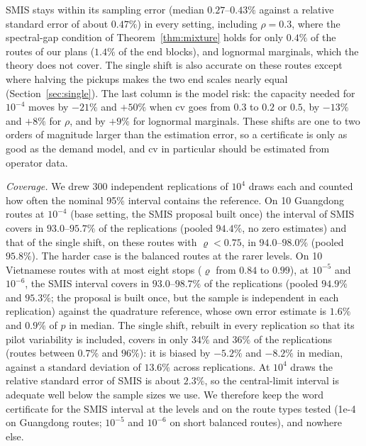 \documentclass[11pt]{article}
\theoremstyle{definition}
\theoremstyle{remark}
\begin{document}
SMIS stays within its sampling error (median $0.27$--$0.43\%$ against a
relative standard error of about $0.47\%$) in every setting, including
$\rho=0.3$, where the spectral-gap condition of Theorem~\ref{thm:mixture}
holds for only $0.4\%$ of the routes of our plans ($1.4\%$ of the end blocks), and lognormal
marginals, which the theory does not cover. The single shift is also accurate
on these routes except where halving the pickups makes the two end scales
nearly equal (Section~\ref{sec:single}). The last column is the model risk:
the capacity needed for $10^{-4}$ moves by $-21\%$ and $+50\%$ when cv goes
from $0.3$ to $0.2$ or $0.5$, by $-13\%$ and $+8\%$ for $\rho$, and by $+9\%$
for lognormal marginals. These shifts are one to two orders of magnitude
larger than the estimation error, so a certificate is only as good as the
demand model, and cv in particular should be estimated from operator data.

\emph{Coverage.} We drew 300 independent replications of $10^4$ draws each and
counted how often the nominal 95\% interval contains the reference. On 10
Guangdong routes at $10^{-4}$ (base setting, the SMIS proposal built once) the
interval of SMIS covers in $93.0$--$95.7\%$ of the replications (pooled
$94.4\%$, no zero estimates) and that of the single shift, on these routes with
$\varrho<0.75$, in $94.0$--$98.0\%$ (pooled $95.8\%$). The harder case is the
balanced routes at the rarer levels. On 10 Vietnamese routes with at most
eight stops ($\varrho$ from $0.84$ to $0.99$), at $10^{-5}$ and $10^{-6}$, the
SMIS interval covers in $93.0$--$98.7\%$ of the replications (pooled $94.9\%$
and $95.3\%$; the proposal is built once, but the sample is independent in
each replication) against the quadrature reference, whose own error estimate is
$1.6\%$ and $0.9\%$ of $p$ in median. The single shift, rebuilt in every
replication so that its pilot variability is included, covers in only
$34\%$ and $36\%$ of the replications (routes between $0.7\%$ and
$96\%$): it is biased by $-5.2\%$ and $-8.2\%$ in median, against a standard
deviation of $13.6\%$ across replications. At $10^4$ draws the relative
standard error of SMIS is about $2.3\%$, so the central-limit interval is
adequate well below the sample sizes we use. We therefore keep the word
certificate for the SMIS interval at the levels and on the route types tested
(1e-4 on Guangdong routes; $10^{-5}$ and $10^{-6}$ on short balanced
routes), and nowhere else.
\end{document}
